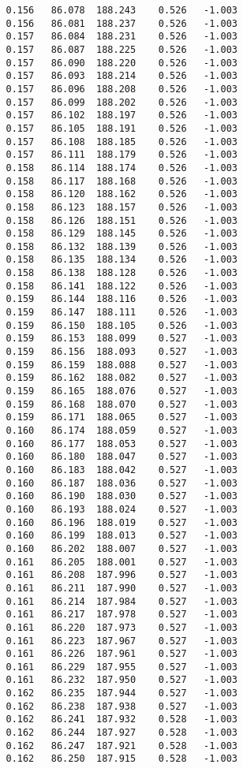 \begin{verbatim}
   0.156   86.078  188.243    0.526   -1.003
   0.156   86.081  188.237    0.526   -1.003
   0.157   86.084  188.231    0.526   -1.003
   0.157   86.087  188.225    0.526   -1.003
   0.157   86.090  188.220    0.526   -1.003
   0.157   86.093  188.214    0.526   -1.003
   0.157   86.096  188.208    0.526   -1.003
   0.157   86.099  188.202    0.526   -1.003
   0.157   86.102  188.197    0.526   -1.003
   0.157   86.105  188.191    0.526   -1.003
   0.157   86.108  188.185    0.526   -1.003
   0.157   86.111  188.179    0.526   -1.003
   0.158   86.114  188.174    0.526   -1.003
   0.158   86.117  188.168    0.526   -1.003
   0.158   86.120  188.162    0.526   -1.003
   0.158   86.123  188.157    0.526   -1.003
   0.158   86.126  188.151    0.526   -1.003
   0.158   86.129  188.145    0.526   -1.003
   0.158   86.132  188.139    0.526   -1.003
   0.158   86.135  188.134    0.526   -1.003
   0.158   86.138  188.128    0.526   -1.003
   0.158   86.141  188.122    0.526   -1.003
   0.159   86.144  188.116    0.526   -1.003
   0.159   86.147  188.111    0.526   -1.003
   0.159   86.150  188.105    0.526   -1.003
   0.159   86.153  188.099    0.527   -1.003
   0.159   86.156  188.093    0.527   -1.003
   0.159   86.159  188.088    0.527   -1.003
   0.159   86.162  188.082    0.527   -1.003
   0.159   86.165  188.076    0.527   -1.003
   0.159   86.168  188.070    0.527   -1.003
   0.159   86.171  188.065    0.527   -1.003
   0.160   86.174  188.059    0.527   -1.003
   0.160   86.177  188.053    0.527   -1.003
   0.160   86.180  188.047    0.527   -1.003
   0.160   86.183  188.042    0.527   -1.003
   0.160   86.187  188.036    0.527   -1.003
   0.160   86.190  188.030    0.527   -1.003
   0.160   86.193  188.024    0.527   -1.003
   0.160   86.196  188.019    0.527   -1.003
   0.160   86.199  188.013    0.527   -1.003
   0.160   86.202  188.007    0.527   -1.003
   0.161   86.205  188.001    0.527   -1.003
   0.161   86.208  187.996    0.527   -1.003
   0.161   86.211  187.990    0.527   -1.003
   0.161   86.214  187.984    0.527   -1.003
   0.161   86.217  187.978    0.527   -1.003
   0.161   86.220  187.973    0.527   -1.003
   0.161   86.223  187.967    0.527   -1.003
   0.161   86.226  187.961    0.527   -1.003
   0.161   86.229  187.955    0.527   -1.003
   0.161   86.232  187.950    0.527   -1.003
   0.162   86.235  187.944    0.527   -1.003
   0.162   86.238  187.938    0.527   -1.003
   0.162   86.241  187.932    0.528   -1.003
   0.162   86.244  187.927    0.528   -1.003
   0.162   86.247  187.921    0.528   -1.003
   0.162   86.250  187.915    0.528   -1.003

\end{verbatim}
